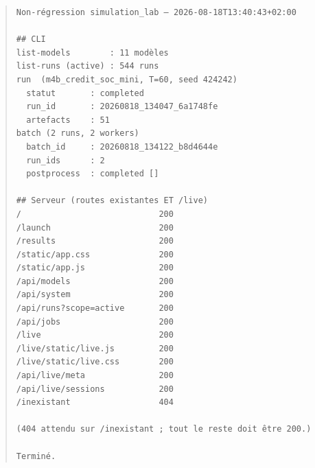 \begin{quote}\footnotesize\begin{verbatim}
Non-régression simulation_lab — 2026-08-18T13:40:43+02:00

## CLI
list-models        : 11 modèles
list-runs (active) : 544 runs
run  (m4b_credit_soc_mini, T=60, seed 424242)
  statut       : completed
  run_id       : 20260818_134047_6a1748fe
  artefacts    : 51
batch (2 runs, 2 workers)
  batch_id     : 20260818_134122_b8d4644e
  run_ids      : 2
  postprocess  : completed []

## Serveur (routes existantes ET /live)
/                            200
/launch                      200
/results                     200
/static/app.css              200
/static/app.js               200
/api/models                  200
/api/system                  200
/api/runs?scope=active       200
/api/jobs                    200
/live                        200
/live/static/live.js         200
/live/static/live.css        200
/api/live/meta               200
/api/live/sessions           200
/inexistant                  404

(404 attendu sur /inexistant ; tout le reste doit être 200.)

Terminé.
\end{verbatim}\end{quote}
